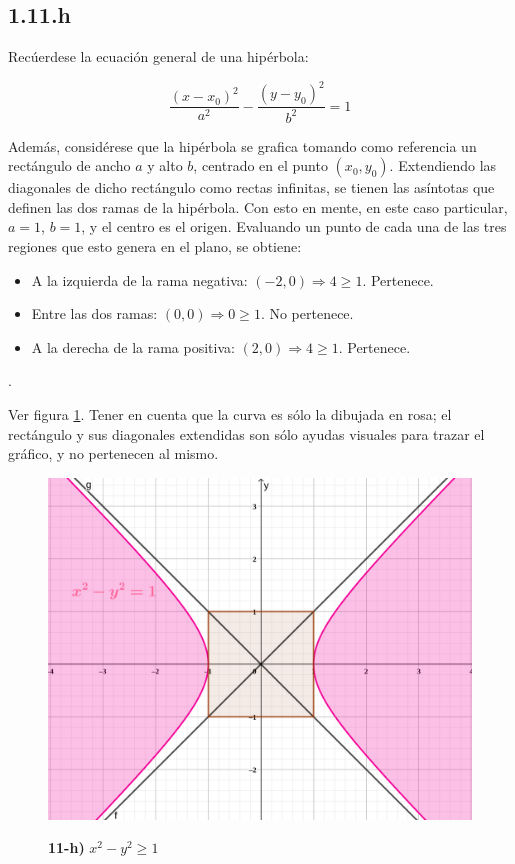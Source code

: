 \documentclass{article}
\begin{document}
\subsection*{1.11.h}
\label{subsec:1.11.h}

Recúerdese la ecuación general de una hipérbola:

\begin{equation}
\frac{(x-x_0)^2}{a^2} - \frac{(y-y_0)^2}{b^2} = 1
\end{equation}

Además, considérese que la hipérbola se grafica tomando como referencia un rectángulo de ancho $a$ y alto $b$, centrado en el punto $(x_0, y_0)$. Extendiendo las diagonales de dicho rectángulo como rectas infinitas, se tienen las asíntotas que definen las dos ramas de la hipérbola. Con esto en mente, en este caso particular, $a=1$, $b=1$, y el centro es el origen. Evaluando un punto de cada una de las tres regiones que esto genera en el plano, se obtiene:

\begin{itemize}
\item A la izquierda de la rama negativa: $(-2, 0) \Rightarrow 4 \geq 1$. Pertenece.
\item Entre las dos ramas: $(0, 0) \Rightarrow 0 \geq 1$. No pertenece.
\item A la derecha de la rama positiva: $(2, 0) \Rightarrow 4 \geq 1$. Pertenece.
\end{itemize}.

Ver figura \ref{fig:1-11-h}. Tener en cuenta que la curva es sólo la dibujada en rosa; el rectángulo y sus diagonales extendidas son sólo ayudas visuales para trazar el gráfico, y no pertenecen al mismo.

\begin{figure}[ht]
\caption{\textbf{11-h)} $x^2 - y^2 \geq 1$}
\includegraphics[scale=0.75]{../img/exercises/guide_01/11_h.png} 
\centering
\label{fig:1-11-h}
\end{figure}
\end{document}
